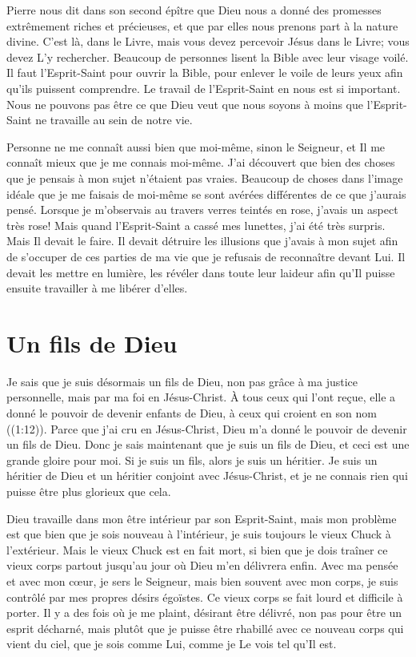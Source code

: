 Pierre nous dit dans son second épître que Dieu nous a donné
 des promesses extrêmement riches et précieuses,
 et que par elles nous prenons part à la nature divine.
 C'est là, dans le Livre, mais vous devez percevoir Jésus dans le Livre;
 vous devez L'y rechercher.
 Beaucoup de personnes lisent la Bible avec leur visage voilé.
 Il faut l'Esprit-Saint pour ouvrir la Bible, pour enlever le voile
 de leurs yeux afin qu'ils puissent comprendre.
 Le travail de l'Esprit-Saint en nous est si important.
 Nous ne pouvons pas être ce que Dieu veut que nous soyons
 à moins que l'Esprit-Saint ne travaille au sein de notre vie.

Personne ne me connaît aussi bien que moi-même, sinon le Seigneur,
 et Il me connaît mieux que je me connais moi-même.
 J'ai découvert que bien des choses que je pensais
 à mon sujet n'étaient pas vraies.
 Beaucoup de choses dans l'image idéale que je me faisais de moi-même
 se sont avérées différentes de ce que j'aurais pensé.
 Lorsque je m'observais au travers verres teintés en rose,
 j'avais un aspect très rose!
 Mais quand l'Esprit-Saint a cassé mes lunettes,
 j'ai été très surpris. Mais Il devait le faire.
 Il devait détruire les illusions que j'avais à mon sujet afin de s'occuper
 de ces parties de ma vie que je refusais de reconnaître devant Lui.
 Il devait les mettre en lumière, les révéler dans toute leur laideur
 afin qu'Il puisse ensuite travailler à me libérer d'elles.


\section*{Un fils de Dieu}

Je sais que je suis désormais un fils de Dieu,
 non pas grâce à ma justice personnelle,
 mais par ma foi en Jésus-Christ.
 \og À tous ceux qui l'ont reçue, elle a donné le pouvoir
 de devenir enfants de Dieu,
 à ceux qui croient en son nom \fg{} ((1:12)).
 Parce que j'ai cru en Jésus-Christ, Dieu m'a donné le pouvoir
 de devenir un fils de Dieu.
 Donc je sais maintenant que je suis un fils de Dieu,
 et ceci est une grande gloire pour moi.
 Si je suis un fils, alors je suis un héritier.
 Je suis un héritier de Dieu et un héritier conjoint avec Jésus-Christ,
 et je ne connais rien qui puisse être plus glorieux que cela.

Dieu travaille dans mon être intérieur par son Esprit-Saint,
 mais mon problème est que bien que je sois nouveau à l'intérieur,
 je suis toujours le vieux Chuck à l'extérieur.
 Mais le vieux Chuck est en fait mort, si bien que je dois traîner
 ce vieux corps partout jusqu'au jour où Dieu m'en délivrera enfin.
 Avec ma pensée et avec mon cœur, je sers le Seigneur,
 mais bien souvent avec mon corps,
 je suis contrôlé par mes propres désirs égoïstes.
 Ce vieux corps se fait lourd et difficile à porter.
 Il y a des fois où je me plaint, désirant être délivré,
 non pas pour être un esprit décharné, mais plutôt que je puisse
 être rhabillé avec ce nouveau corps qui vient du ciel,
 que je sois comme Lui, comme je Le vois tel qu'Il est.

